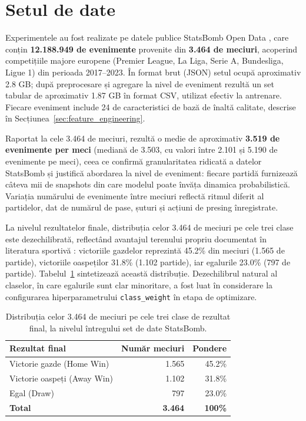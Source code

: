 \section{Setul de date}

Experimentele au fost realizate pe datele publice StatsBomb Open Data
\cite{StatsBomb}, care conțin \textbf{12.188.949 de evenimente} provenite
din \textbf{3.464 de meciuri}, acoperind competițiile majore europene
(Premier League, La Liga, Serie A, Bundesliga, Ligue 1) din perioada
2017--2023. În format brut (JSON) setul ocupă aproximativ 2.8 GB; după
preprocesare și agregare la nivel de eveniment rezultă un set tabular de
aproximativ 1.87 GB în format CSV, utilizat efectiv la antrenare. Fiecare
eveniment include 24 de caracteristici de bază de înaltă calitate,
descrise în Secțiunea~\ref{sec:feature_engineering}.

Raportat la cele 3.464 de meciuri, rezultă o medie de aproximativ
\textbf{3.519 de evenimente per meci} (mediană de 3.503, cu valori între
2.101 și 5.190 de evenimente pe meci), ceea ce confirmă granularitatea
ridicată a datelor StatsBomb și justifică abordarea la nivel de eveniment:
fiecare partidă furnizează câteva mii de snapshots din care modelul poate
învăța dinamica probabilistică. Variația numărului de evenimente între
meciuri reflectă ritmul diferit al partidelor, dat de numărul de pase,
șuturi și acțiuni de presing înregistrate.

La nivelul rezultatelor finale, distribuția celor 3.464 de meciuri pe cele
trei clase este dezechilibrată, reflectând avantajul terenului propriu
documentat în literatura sportivă \cite{Robberechts2019}: victoriile
gazdelor reprezintă 45.2\% din meciuri (1.565 de partide), victoriile
oaspeților 31.8\% (1.102 partide), iar egalurile 23.0\% (797 de partide).
Tabelul~\ref{tab:distributie_clase} sintetizează această distribuție.
Dezechilibrul natural al claselor, în care egalurile sunt clar
minoritare, a fost luat în considerare la configurarea hiperparametrului
\texttt{class\_weight} în etapa de optimizare.

\begin{table}[htbp]
\centering
\begin{tabular}{|l|r|r|}
\hline
\textbf{Rezultat final} & \textbf{Număr meciuri} & \textbf{Pondere} \\
\hline
Victorie gazde (Home Win) & 1.565 & 45.2\% \\
\hline
Victorie oaspeți (Away Win) & 1.102 & 31.8\% \\
\hline
Egal (Draw) & 797 & 23.0\% \\
\hline
\textbf{Total} & \textbf{3.464} & \textbf{100\%} \\
\hline
\end{tabular}
\caption{Distribuția celor 3.464 de meciuri pe cele trei clase de rezultat
         final, la nivelul întregului set de date StatsBomb.}
\label{tab:distributie_clase}
\end{table}

